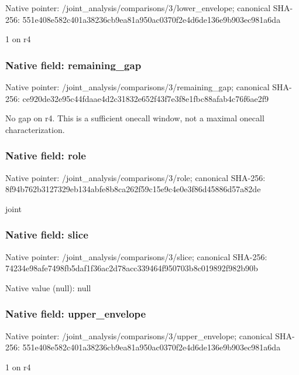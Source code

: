 \documentclass[10pt,a4paper]{article}
\begin{document}
Native pointer: /joint\_analysis/comparis\allowbreak{}ons/3/lower\_envelope; canonical SHA-256: 551e408e582c401a38236cb9\allowbreak{}ea81a950ac0370f2e4d6de13\allowbreak{}6e9b903ec981a6da


1 on r4


\subsubsection{Native field: remaining\_gap}


Native pointer: /joint\_analysis/comparis\allowbreak{}ons/3/remaining\_gap; canonical SHA-256: ce920de32e95c44fdaae4d2c\allowbreak{}31832e652f43f7e3f8e1fbc8\allowbreak{}8afab4c76f6ae2f9


No gap on r4. This is a sufficient onecall window, not a maximal onecall characterization.


\subsubsection{Native field: role}


Native pointer: /joint\_analysis/comparisons/3/role; canonical SHA-256: 8f94b762b3127329eb134abf\allowbreak{}e8b8ca262f59c15e9c4e0e3f\allowbreak{}86d45886d57a82de


joint


\subsubsection{Native field: slice}


Native pointer: /joint\_analysis/comparisons/3/slice; canonical SHA-256: 74234e98afe7498fb5daf1f3\allowbreak{}6ac2d78acc339464f950703b\allowbreak{}8c019892f982b90b



Native value (null): null



\subsubsection{Native field: upper\_envelope}


Native pointer: /joint\_analysis/comparis\allowbreak{}ons/3/upper\_envelope; canonical SHA-256: 551e408e582c401a38236cb9\allowbreak{}ea81a950ac0370f2e4d6de13\allowbreak{}6e9b903ec981a6da


1 on r4
\end{document}
